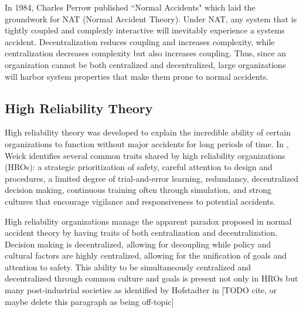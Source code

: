 \documentclass[11pt]{article}
\begin{document}
In 1984, Charles Perrow published ``Normal Accidents" \cite{perrow1984living} which laid the
groundwork for NAT (Normal Accident Theory). Under NAT, any system that is tightly coupled
and complexly interactive will inevitably experience a systems accident. Decentralization reduces
coupling and increases complexity, while centralization decreases complexity but also increases
coupling. Thus, since an organization cannot be both centralized and decentralized, large
organizations will harbor system properties that make them prone to normal accidents.

\subsection{High Reliability Theory}


High reliability theory was developed to explain the incredible ability of certain organizations to
function without major accidents for long periods of time. In \cite{weick1999reliability}, Weick
identifies several common traits shared by high reliability organizations (HROs): a strategic
prioritization of safety, careful attention to design and procedures, a limited degree of
trial-and-error learning, redundancy, decentralized decision making, continuous training often
through simulation, and strong cultures that encourage vigilance and responsiveness to potential
accidents.  

High reliability organizations manage the apparent paradox proposed in normal accident theory by
having traits of both centralization and decentralization. Decision making is decentralized,
allowing for decoupling while policy and cultural factors are highly centralized, allowing for the
unification of goals and attention to safety. This ability to be simultaneously centralized and
decentralized through common culture and goals is present not only in HROs but many post-industrial
societies as identified by Hofstadter in [TODO cite, or maybe delete this paragraph as being
off-topic]
\end{document}
